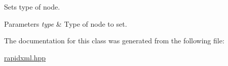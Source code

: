 Sets type of node. 
\begin{DoxyParams}{Parameters}
{\em type} & Type of node to set. \\
\hline
\end{DoxyParams}


The documentation for this class was generated from the following file\+:\begin{DoxyCompactItemize}
\item 
\hyperlink{rapidxml_8hpp}{rapidxml.\+hpp}\end{DoxyCompactItemize}
